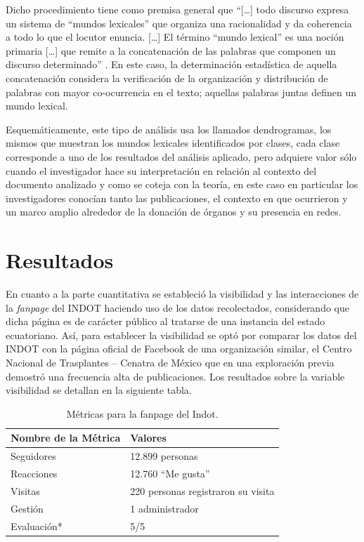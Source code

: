 \documentclass[spanish]{textolivre}
\begin{document}
Dicho procedimiento tiene como premisa general que “[\ldots] todo discurso expresa un sistema de “mundos lexicales” que organiza una racionalidad y da coherencia a todo lo que el locutor enuncia. [\ldots] El término “mundo lexical” es una noción primaria [\ldots] que remite a la concatenación de las palabras que componen un discurso determinado” \cite[p. 10]{ruiz_bueno2016}. En este caso, la determinación estadística de aquella concatenación considera la verificación de la organización y distribución de palabras con mayor co-ocurrencia en el texto; aquellas palabras juntas definen un mundo lexical. 

Esquemáticamente, este tipo de análisis usa los llamados dendrogramas, los mismos que muestran los mundos lexicales identificados por clases, cada clase corresponde a uno de los resultados del análisis aplicado, pero adquiere valor sólo cuando el investigador hace su interpretación en relación al contexto del documento analizado y como se coteja con la teoría, en este caso en particular los investigadores conocían tanto las publicaciones, el contexto en que ocurrieron y un marco amplio alrededor de la donación de órganos y su presencia en redes. 

\section{Resultados}\label{sec-resultados}
En cuanto a la parte cuantitativa se estableció la visibilidad y las interacciones de la \emph{fanpage} del INDOT haciendo uso de los datos recolectados, considerando que dicha página es de carácter público al tratarse de una instancia del estado ecuatoriano. Así, para establecer la visibilidad se optó por comparar los datos del INDOT con la página oficial de Facebook de una organización similar, el Centro Nacional de Trasplantes – Cenatra de México que en una exploración previa demostró una frecuencia alta de publicaciones. Los resultados sobre la variable visibilidad se detallan en la siguiente tabla.

\begin{table}[htpb]
\caption{Métricas para la fanpage del Indot.}
\label{tab1}
\centering
\begin{tabular}{ll}
\toprule
Nombre de la Métrica & Valores
\\
\midrule
Seguidores & 12.899 personas
\\
Reacciones & 12.760 “Me gusta”
\\
Visitas	& 220 personas registraron su visita
\\
Gestión	& 1 administrador
\\
Evaluación*	& 5/5
\\
\bottomrule
\end{tabular}
\centering
\end{table}
\end{document}
